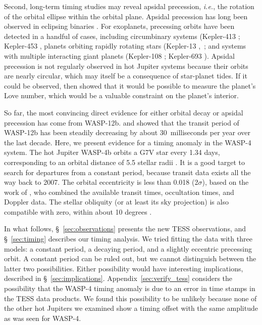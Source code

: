 \documentclass[12pt,twocolumn,tighten]{aastex62}
\begin{document}
Second, long-term timing studies may reveal apsidal precession, {\it
  i.e.}, the rotation of the orbital ellipse within the orbital
plane. Apsidal precession has long been observed in eclipsing binaries
\citep[{\it e.g.},][]{
  schwarzschild_structure_1958,torres_accurate_2010,borkovits_eclipse_2015}.
For exoplanets, precessing orbits have been detected in a handful of
cases, including circumbinary systems (Kepler-413
\citealt{kostov_kepler-413b_2014}; Kepler-453
\citealt{welsh_kepler_2015}, planets orbiting rapidly rotating stars
(Kepler-13
\citealt{szabo_spin-orbit_2012,szabo_mapping_2014},~\citealt{masuda_spin-orbit_2015};
and systems with multiple interacting giant planets (Kepler-108
\citealt{mills_kepler-108_2017}; Kepler-693
\citealt{masuda_eccentric_2017}).  Apsidal precession is not regularly
observed in hot Jupiter systems because their orbits are nearly
circular, which may itself be a consequence of star-planet tides.  If
it could be observed, then \citet{ragozzine_probing_2009} showed that
it would be possible to measure the planet's Love number, which would
be a valuable constraint on the planet's interior.

So far, the most convincing direct evidence for either orbital decay
or apsidal precession has come from WASP-12b.
\citet{maciejewski_departure_2016} and \citet{patra_2017} showed that
the transit period of WASP-12b has been steadily decreasing by about
30~milliseconds per year over the last decade.  Here, we present
evidence for a timing anomaly in the WASP-4 system.  The hot Jupiter
WASP-4b orbits a G7V star every 1.34 days, corresponding to an orbital
distance of 5.5 stellar radii
\citep{wilson_wasp-4b_2008,hoyer_tramos_2013}.  It is a good target to
search for departures from a constant period, because transit data
exists all the way back to 2007.  The orbital eccentricity is less
than 0.018 (2$\sigma$), based on the work of
\cite{knutson_friends_2014}, who combined the available transit times,
occultation times, and Doppler data.  The stellar obliquity (or at
least its sky projection) is also compatible with zero, within about
10 degrees
\citep{triaud_spin-orbit_2010,beerer_secondary_2011,sanchis-ojeda_starspots_2011}.

In what follows, \S~\ref{sec:observations} presents the new TESS
observations, and \S~\ref{sec:timing} describes our timing
analysis.  We tried fitting the data with three models: a constant
period, a decaying period, and a slightly eccentric precessing orbit.
A constant period can be ruled out, but we cannot distinguish between
the latter two possibilities.  Either possibility would have
interesting implications, described in \S~\ref{sec:implications}.
Appendix~\ref{sec:verify_tess} considers the possibility that the
WASP-4 timing anomaly is due to an error in time stamps in the TESS
data products.  We found this possibility to be unlikely because none
of the other hot Jupiters we examined show a timing offset with the
same amplitude as was seen for WASP-4.
\end{document}
